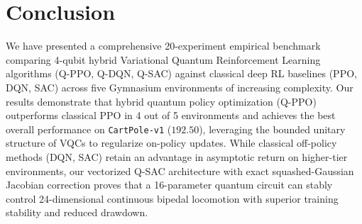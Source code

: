 \documentclass[conference]{IEEEtran}
\begin{document}
\section{Conclusion}
We have presented a comprehensive 20-experiment empirical benchmark comparing 4-qubit hybrid Variational Quantum Reinforcement Learning algorithms (Q-PPO, Q-DQN, Q-SAC) against classical deep RL baselines (PPO, DQN, SAC) across five Gymnasium environments of increasing complexity. Our results demonstrate that hybrid quantum policy optimization (Q-PPO) outperforms classical PPO in 4 out of 5 environments and achieves the best overall performance on \texttt{CartPole-v1} ($192.50$), leveraging the bounded unitary structure of VQCs to regularize on-policy updates. While classical off-policy methods (DQN, SAC) retain an advantage in asymptotic return on higher-tier environments, our vectorized Q-SAC architecture with exact squashed-Gaussian Jacobian correction proves that a 16-parameter quantum circuit can stably control 24-dimensional continuous bipedal locomotion with superior training stability and reduced drawdown.
\end{document}
